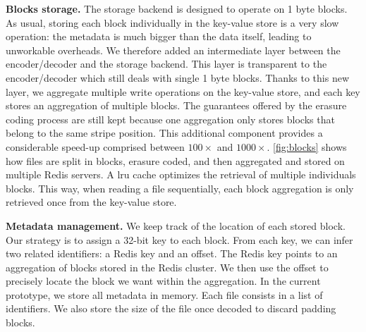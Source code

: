 \textbf{Blocks storage.} The storage backend is designed to operate on 1 byte blocks. 
As usual, storing each block individually in the key-value store is a very slow operation: the metadata is much bigger than the data itself, leading to unworkable overheads. 
We therefore added an intermediate layer between the encoder/decoder and the storage backend. 
This layer is transparent to the encoder/decoder which still deals with single 1 byte blocks. 
Thanks to this new layer, we aggregate multiple write operations on the key-value store, and each key stores an aggregation of multiple blocks.
The guarantees offered by the erasure coding process are still kept because one aggregation only stores blocks that belong to the same stripe position. 
This additional component provides a considerable speed-up comprised between $100\times$ and $1000\times$. 
\autoref{fig:blocks} shows how files are split in blocks, erasure coded, and then aggregated and stored on multiple Redis servers. %
A \ac{lru} cache optimizes the retrieval of multiple individuals blocks.
This way, when reading a file sequentially, each block aggregation is only retrieved once from the key-value store.

\textbf{Metadata management.} We keep track of the location of each stored block. 
Our strategy is to assign a 32-bit key to each block. 
From each key, we can infer two related identifiers: a Redis key and an offset. 
The Redis key points to an aggregation of blocks stored in the Redis cluster. 
We then use the offset to precisely locate the block we want within the aggregation.
In the current prototype, we store all metadata in memory. 
Each file consists in a list of identifiers. 
We also store the size of the file once decoded to discard padding blocks. 

